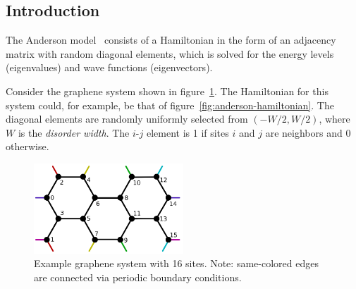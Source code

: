 \documentclass{revtex4}
\begin{document}
\subsection{Introduction}

The Anderson model~\cite{duxbury2011} consists of a Hamiltonian in the form of an adjacency matrix with random diagonal elements, which is solved for the energy levels (eigenvalues) and wave functions (eigenvectors).

Consider the graphene system shown in figure~\ref{fig:example-system}. The Hamiltonian for this system could, for example, be that of figure~\ref{fig:anderson-hamiltonian}. The diagonal elements are randomly uniformly selected from $(-W/2, W/2)$, where $W$ is the \emph{disorder width}. The $i$-$j$ element is 1 if sites $i$ and $j$ are neighbors and 0 otherwise.

\begin{figure}[h!]
\includegraphics[width=0.5\textwidth]{example-system.png}
\caption{Example graphene system with 16 sites. Note: same-colored edges are connected via periodic boundary conditions.}
\label{fig:example-system}
\end{figure}
\end{document}
